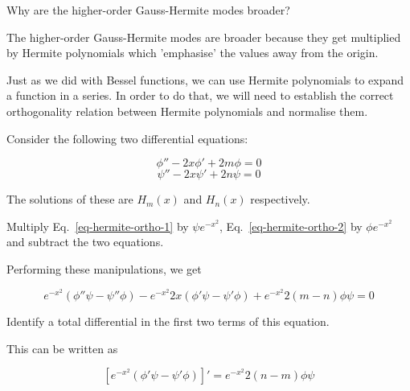 \begin{cue}
Why are the higher-order Gauss-Hermite modes broader?  
\end{cue}

The higher-order Gauss-Hermite modes are broader because they get multiplied by Hermite polynomials which 'emphasise' the values away from the origin.

\pagebreak



Just as we did with Bessel functions, we can use Hermite polynomials to expand a function in a series. In order to do that, we will need to establish the correct orthogonality relation between Hermite polynomials and normalise them.


Consider the following two differential equations:

\begin{equation}
\phi'' - 2 x \phi' + 2m \phi = 0 \label{eq-hermite-ortho-1}
\end{equation}
\begin{equation}
\psi'' - 2 x \psi' + 2n \psi = 0 \label{eq-hermite-ortho-2}
\end{equation}

The solutions of these are $H_m(x)$ and $H_n(x)$ respectively.

\begin{cue}
Multiply Eq.~\ref{eq-hermite-ortho-1} by $\psi e^{-x^2}$, Eq.~\ref{eq-hermite-ortho-2} by $\phi e^{-x^2}$ and subtract the two equations.
\end{cue}

Performing these manipulations, we get

\begin{equation}
e^{-x^2}\left(\phi''\psi -\psi''\phi\right)- e^{-x^2} 2 x \left(\phi'\psi -\psi'\phi\right)+ e^{-x^2}2(m-n)\phi\psi = 0
\end{equation} 

\begin{cue}
Identify a total differential in the first two terms of this equation.
\end{cue}

This can be written as

\begin{equation}
\left[e^{-x^2}\left(\phi'\psi -\psi'\phi\right)\right]' = e^{-x^2}2(n-m)\phi\psi
\end{equation} 

